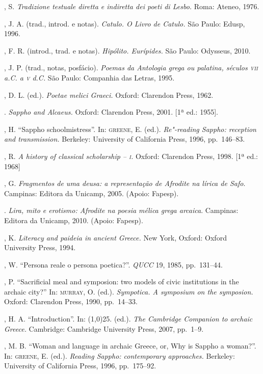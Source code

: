 \begin{bibliohedra}
, S. \textit{Tradizione testuale diretta e indiretta dei poeti
di Lesbo.} Roma: Ateneo, 1976. 

, J. A. (trad., introd. e notas). \textit{Catulo. O Livro de
Catulo.} São Paulo: Edusp, 1996.

, F. R. (introd., trad. e notas). \textit{Hipólito. Eurípides.}
São Paulo: Odysseus, 2010.

, J. P. (trad., notas, posfácio). \textit{Poemas da Antologia grega
ou palatina, séculos \textsc{vii} a.C. a \textsc{v} d.C.} São Paulo: Companhia das Letras, 1995.

, D. L. (ed.). \textit{Poetae melici Graeci.} Oxford: Clarendon
Press, 1962.

\titidem. \textit{Sappho and Alcaeus.} Oxford: Clarendon
Press, 2001. [1ª ed.: 1955].

, H. “Sappho schoolmistress”. In: \textsc{greene}, E. (ed.).
\textit{Re"-reading Sappho: reception and transmission.} Berkeley: University of
California Press, 1996, pp.~146--83.

, R. \textit{A history of classical scholarship -- \textsc{i}.} Oxford:
Clarendon Press, 1998. [1ª ed.: 1968]

, G. \textit{Fragmentos de uma deusa: a representação de Afrodite
na lírica de Safo}. Campinas: Editora da Unicamp, 2005. (Apoio: Fapesp).

\titidem. \textit{Lira, mito e erotismo: Afrodite na poesia mélica grega
arcaica}. Campinas: Editora da Unicamp, 2010. (Apoio: Fapesp).

, K. \textit{Literacy and paideia in ancient Greece.} New York,
Oxford: Oxford University Press, 1994.

, W. “Persona reale o persona poetica?”. \textit{QUCC} 19, 1985,
pp.~131--44.

, P. “Sacrificial meal and symposion: two models of
civic institutions in the archaic city?” In: \textsc{murray}, O. (ed.).
\textit{Sympotica. A symposium on the symposion.} Oxford: Clarendon Press,
1990, pp.~14--33.

, H. A. “Introduction”. In: \line(1,0){25}.
(ed.). \textit{The Cambridge Companion to archaic Greece.} Cambridge: Cambridge
University Press, 2007, pp.~1--9.

, M. B. “Woman and language in archaic Greece, or, Why is Sappho
a woman?”. In: \textsc{greene}, E. (ed.). \textit{Reading Sappho: contemporary
approaches.} Berkeley: University of California Press, 1996, pp.~175--92.


\end{bibliohedra}

